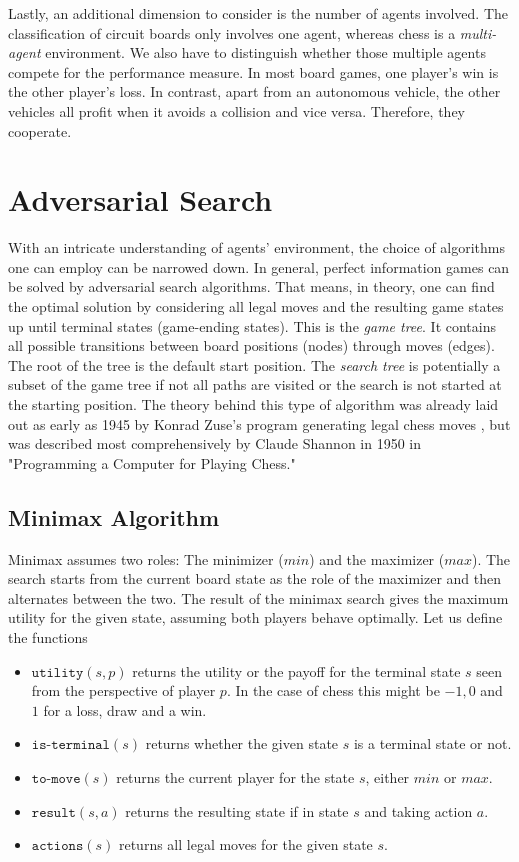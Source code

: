 Lastly, an additional dimension to consider is the number of agents involved. The classification of circuit boards only involves one agent, whereas chess is a \textit{multi-agent} environment. We also have to distinguish whether those multiple agents compete for the performance measure. In most board games, one player's win is the other player's loss. In contrast, apart from an autonomous vehicle, the other vehicles all profit when it avoids a collision and vice versa. Therefore, they cooperate.

\section{Adversarial Search}
With an intricate understanding of agents' environment, the choice of algorithms one can employ can be narrowed down. In general, perfect information games can be solved by adversarial search algorithms. That means, in theory, one can find the optimal solution by considering all legal moves and the resulting game states up until terminal states (game-ending states). This is the \textit{game tree}. It contains all possible transitions between board positions (nodes) through moves (edges). The root of the tree is the default start position. The \textit{search tree} is potentially a subset of the game tree if not all paths are visited or the search is not started at the starting position. The theory behind this type of algorithm was already laid out as early as 1945 by Konrad Zuse's program generating legal chess moves \cite{knuth_early_1980}, but was described most comprehensively by Claude Shannon in 1950 in "Programming a Computer for Playing Chess." \cite{shannon_xxii_1950}

\subsection{Minimax Algorithm}
Minimax assumes two roles: The minimizer ($min$) and the maximizer ($max$). The search starts from the current board state as the role of the maximizer and then alternates between the two. The result of the minimax search gives the maximum utility for the given state, assuming both players behave optimally. Let us define the functions \cite[p. 303f.]{russell_artificial_2021}
\begin{itemize}
    \item $\texttt{utility}(s, p)$ returns the utility or the payoff for the terminal state $s$ seen from the perspective of player $p$. In the case of chess this might be $-1, 0$ and $1$ for a loss, draw and a win.
    \item $\texttt{is-terminal}(s)$ returns whether the given state $s$ is a terminal state or not.
    \item $\texttt{to-move}(s)$ returns the current player for the state $s$, either $min$ or $max$.
    \item $\texttt{result}(s, a)$ returns the resulting state if in state $s$ and taking action $a$.
    \item $\texttt{actions}(s)$ returns all legal moves for the given state $s$.
\end{itemize}

